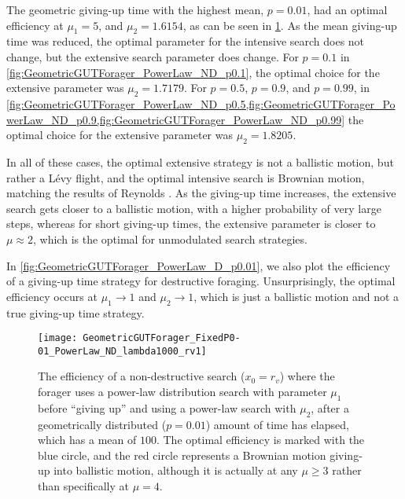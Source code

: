 The geometric giving-up time with the highest mean, $p=0.01$, had an optimal efficiency at $\mu_1 = 5$, and $\mu_2=1.6154$, as can be seen in \cref{fig:GeometricGUTForager_PowerLaw_ND_p0.01}. As the mean giving-up time was reduced, the optimal parameter for the intensive search does not change, but the extensive search parameter does change. For $p=0.1$ in \cref{fig:GeometricGUTForager_PowerLaw_ND_p0.1}, the optimal choice for the extensive parameter was $\mu_2= 1.7179$. For $p=0.5$, $p=0.9$, and $p=0.99$, in \cref{fig:GeometricGUTForager_PowerLaw_ND_p0.5,fig:GeometricGUTForager_PowerLaw_ND_p0.9,fig:GeometricGUTForager_PowerLaw_ND_p0.99} the optimal choice for the extensive parameter was $\mu_2=1.8205$. 

In all of these cases, the optimal extensive strategy is not a ballistic motion, but rather a L\'{e}vy flight, and the optimal intensive search is Brownian motion, matching the results of Reynolds \cite{Reynolds_2009_adaptive}. As the giving-up time increases, the extensive search gets closer to a ballistic motion, with a higher probability of very large steps, whereas for short giving-up times, the extensive parameter is closer to $\mu \approx 2$, which is the optimal for unmodulated search strategies.

In \cref{fig:GeometricGUTForager_PowerLaw_D_p0.01}, we also plot the efficiency of a giving-up time strategy for destructive foraging. Unsurprisingly, the optimal efficiency occurs at $\mu_1\to 1$ and $\mu_2 \to 1$, which is just a ballistic motion and not a true giving-up time strategy.

\begin{figure}[h!]
	\centering
	\texttt{[image: GeometricGUTForager\_FixedP0-01\_PowerLaw\_ND\_lambda1000\_rv1]}
	\caption[Efficiency of two-state Markov-modulated power-law strategy, with giving-up parameter $p=0.01$, for non-destructive foraging]{The efficiency of a non-destructive search ($x_0=r_v$) where the forager uses a power-law distribution search with parameter $\mu_1$ before ``giving up'' and using a power-law search with $\mu_2$, after a geometrically distributed ($p=0.01$) amount of time has elapsed, which has a mean of $100$. The optimal efficiency is marked with the blue circle, and the red circle represents a Brownian motion giving-up into ballistic motion, although it is actually at any $\mu \geq 3$ rather than specifically at $\mu =4$.\label{fig:GeometricGUTForager_PowerLaw_ND_p0.01}}
\end{figure}

